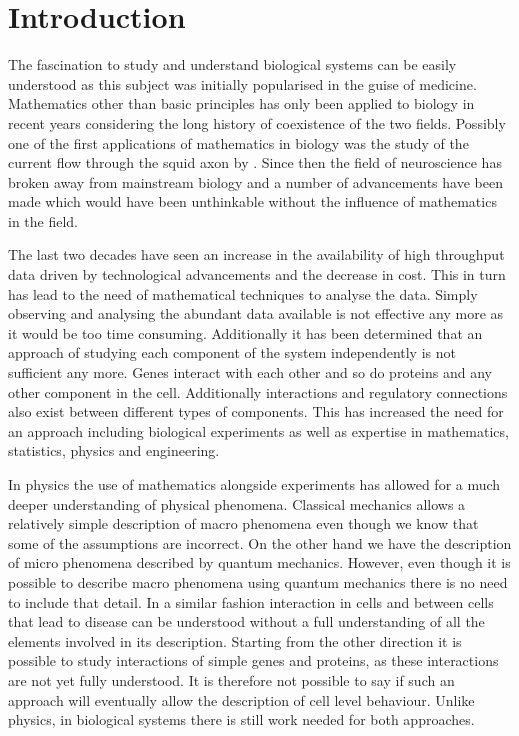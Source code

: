 
\chapter{Introduction}
\label{cha:introduction}

The fascination to study and understand biological systems can be easily understood as this subject was initially popularised in the guise of medicine. Mathematics other than basic principles has only been applied to biology in recent years considering the long history of coexistence of the two fields. Possibly one of the first applications of mathematics in biology was the study of the current flow through the squid axon by \cite{Hodgkin:1952td}. Since then the field of neuroscience has broken away from mainstream biology and a number of advancements have been made which would have been unthinkable without the influence of mathematics in the field.

The last two decades have seen an increase in the availability of high throughput data driven by technological advancements and the decrease in cost. This in turn has lead to the need of mathematical techniques to analyse the data. Simply observing and analysing the abundant data available is not effective any more as it would be too time consuming. Additionally it has been determined that an approach of studying each component of the system independently is not sufficient any more. Genes interact with each other and so do proteins and any other component in the cell. Additionally  interactions and regulatory connections also exist between different types of components. This has increased the need for an approach including biological experiments as well as expertise in mathematics, statistics, physics and engineering.

In physics the use of mathematics alongside experiments has allowed for a much deeper understanding of physical phenomena. Classical mechanics allows a relatively simple description of macro phenomena even though we know that some of the assumptions are incorrect. On the other hand we have the description of micro phenomena described by quantum mechanics. However, even though it is possible to describe macro phenomena using quantum mechanics there is no need to include that detail. In a similar fashion interaction in cells and between cells that lead to disease can be understood without a full understanding of all the elements involved in its description. Starting from the other direction it is possible to study interactions of simple genes and proteins, as these interactions are not yet fully understood. It is therefore not possible to say if such an approach will eventually allow the description of cell level behaviour. Unlike physics, in biological systems there is still work needed for both approaches.

